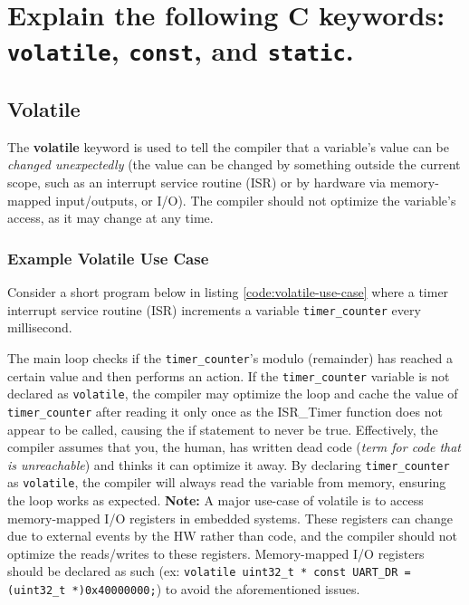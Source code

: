 \documentclass[main.tex]{subfiles}
\begin{document}
\section{Explain the following C keywords: \texttt{volatile}, \texttt{const}, and \texttt{static}.}

\spoilerline

\subsection{Volatile}
The \textbf{volatile} keyword is used to tell the compiler that a variable's value can be \textit{changed unexpectedly} (the value can be changed by something outside the current scope, such as an interrupt service routine (ISR) or by hardware via memory-mapped input/outputs, or I/O). The compiler should not optimize the variable's access, as it may change at any time.

\subsubsection{Example Volatile Use Case}
Consider a short program below in listing \ref{code:volatile-use-case} where a timer interrupt service routine (ISR) increments a variable \texttt{timer\_counter} every millisecond. 



\noindent The main loop checks if the \texttt{timer\_counter}'s modulo (remainder) has reached a certain value and then performs an action. If the \texttt{timer\_counter} variable is not declared as \texttt{volatile}, the compiler may optimize the loop and cache the value of \texttt{timer\_counter} after reading it only once as the ISR\_Timer function does not appear to be called, causing the if statement to never be true. Effectively, the compiler assumes that you, the human, has written dead code (\textit{term for code that is unreachable}) and thinks it can optimize it away. By declaring \texttt{timer\_counter} as \texttt{volatile}, the compiler will always read the variable from memory, ensuring the loop works as expected.
\newline
\newline
\textbf{Note:} A major use-case of volatile is to access memory-mapped I/O registers in embedded systems. These registers can change due to external events by the HW rather than code, and the compiler should not optimize the reads/writes to these registers. Memory-mapped I/O registers should be declared as such (ex: \texttt{volatile uint32\_t * const UART\_DR = (uint32\_t *)0x40000000;}) to avoid the aforementioned issues.
\end{document}

